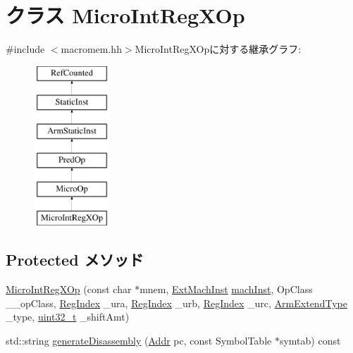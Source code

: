 \hypertarget{classArmISA_1_1MicroIntRegXOp}{
\section{クラス MicroIntRegXOp}
\label{classArmISA_1_1MicroIntRegXOp}
}


{\ttfamily \#include $<$macromem.hh$>$}MicroIntRegXOpに対する継承グラフ:\begin{figure}[H]
\begin{center}
\leavevmode
\includegraphics[height=6cm]{classArmISA_1_1MicroIntRegXOp}
\end{center}
\end{figure}
\subsection*{Protected メソッド}
\begin{DoxyCompactItemize}
\item 
\hyperlink{classArmISA_1_1MicroIntRegXOp_a889cae91e98bf874676003ee46d88edb}{MicroIntRegXOp} (const char $\ast$mnem, \hyperlink{classStaticInst_a5605d4fc727eae9e595325c90c0ec108}{ExtMachInst} \hyperlink{classStaticInst_a744598b194ca3d4201d9414ce4cc4af4}{machInst}, OpClass \_\-\_\-opClass, \hyperlink{classStaticInst_a36d25e03e43fa3bb4c5482cbefe5e0fb}{RegIndex} \_\-ura, \hyperlink{classStaticInst_a36d25e03e43fa3bb4c5482cbefe5e0fb}{RegIndex} \_\-urb, \hyperlink{classStaticInst_a36d25e03e43fa3bb4c5482cbefe5e0fb}{RegIndex} \_\-urc, \hyperlink{namespaceArmISA_a4420842b5673543552a3aba317c69dbb}{ArmExtendType} \_\-type, \hyperlink{Type_8hh_a435d1572bf3f880d55459d9805097f62}{uint32\_\-t} \_\-shiftAmt)
\item 
std::string \hyperlink{classArmISA_1_1MicroIntRegXOp_a95d323a22a5f07e14d6b4c9385a91896}{generateDisassembly} (\hyperlink{classm5_1_1params_1_1Addr}{Addr} pc, const SymbolTable $\ast$symtab) const 
\end{DoxyCompactItemize}
